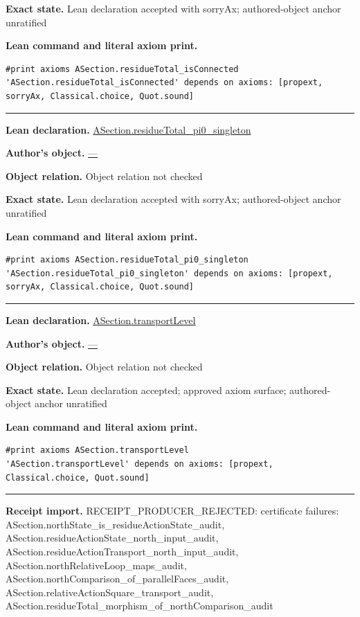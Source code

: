 \documentclass[11pt]{article}
\theoremstyle{plain}
\theoremstyle{definition}
\theoremstyle{remark}
\begin{document}
\begin{tcolorbox}[provenancecard,title={47. Theorem - Concentricity},title after break={47. Theorem - Concentricity (continued)}]
\par\textbf{Exact state.} Lean declaration accepted with sorryAx; authored-object anchor unratified
\par\smallskip\textbf{Lean command and literal axiom print.}
\begin{Verbatim}[breaklines=true,breakanywhere=true,fontsize=\small]
#print axioms ASection.residueTotal_isConnected
'ASection.residueTotal_isConnected' depends on axioms: [propext, sorryAx, Classical.choice, Quot.sound]
\end{Verbatim}
\medskip\hrule\medskip
\textbf{Lean declaration.} \url{ASection.residueTotal_pi0_singleton}
\par\textbf{Author's object.} \url{—}
\par\textbf{Object relation.} Object relation not checked
\par\textbf{Exact state.} Lean declaration accepted with sorryAx; authored-object anchor unratified
\par\smallskip\textbf{Lean command and literal axiom print.}
\begin{Verbatim}[breaklines=true,breakanywhere=true,fontsize=\small]
#print axioms ASection.residueTotal_pi0_singleton
'ASection.residueTotal_pi0_singleton' depends on axioms: [propext, sorryAx, Classical.choice, Quot.sound]
\end{Verbatim}
\medskip\hrule\medskip
\textbf{Lean declaration.} \url{ASection.transportLevel}
\par\textbf{Author's object.} \url{—}
\par\textbf{Object relation.} Object relation not checked
\par\textbf{Exact state.} Lean declaration accepted; approved axiom surface; authored-object anchor unratified
\par\smallskip\textbf{Lean command and literal axiom print.}
\begin{Verbatim}[breaklines=true,breakanywhere=true,fontsize=\small]
#print axioms ASection.transportLevel
'ASection.transportLevel' depends on axioms: [propext, Classical.choice, Quot.sound]
\end{Verbatim}
\medskip\hrule\medskip
\textbf{Receipt import.} \textcolor{KgtRed}{RECEIPT\_PRODUCER\_REJECTED: certificate failures: ASection.northState\_is\_residueActionState\_audit, ASection.residueActionState\_north\_input\_audit, ASection.residueActionTransport\_north\_input\_audit, ASection.northRelativeLoop\_maps\_audit, ASection.northComparison\_of\_parallelFaces\_audit, ASection.relativeActionSquare\_transport\_audit, ASection.residueTotal\_morphism\_of\_northComparison\_audit}
\end{tcolorbox}
\end{document}
